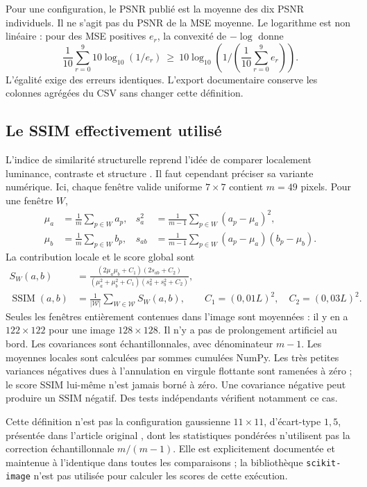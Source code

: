 Pour une configuration, le PSNR publié est la moyenne des dix PSNR
individuels. Il ne s'agit pas du PSNR de la MSE moyenne. Le logarithme est
non linéaire : pour des MSE positives $e_r$, la convexité de $-\log$
donne
\begin{equation}
 \frac1{10}\sum_{r=0}^{9}10\log_{10}(1/e_r)
 \ \geq\ 10\log_{10}\!\left(1/\left(\frac1{10}\sum_{r=0}^{9}e_r\right)\right).
 \label{eq:psnr-mean}
\end{equation}
L'égalité exige des erreurs identiques. L'export documentaire conserve
les colonnes agrégées du CSV sans changer cette définition.

\subsection{Le SSIM effectivement utilisé}

L'indice de similarité structurelle reprend l'idée de comparer localement
luminance, contraste et structure \cite{wang2004}. Il faut cependant
préciser sa variante numérique. Ici, chaque fenêtre valide uniforme
$7\times7$ contient $m=49$ pixels. Pour une fenêtre $W$,
\begin{align}
 \mu_a&=\frac1m\sum_{p\in W}a_p,
 &s_a^2&=\frac1{m-1}\sum_{p\in W}(a_p-\mu_a)^2,\\
 \mu_b&=\frac1m\sum_{p\in W}b_p,
 &s_{ab}&=\frac1{m-1}\sum_{p\in W}(a_p-\mu_a)(b_p-\mu_b).
\end{align}
La contribution locale et le score global sont
\begin{align}
 S_W(a,b)&=
 \frac{(2\mu_a\mu_b+C_1)(2s_{ab}+C_2)}
      {(\mu_a^2+\mu_b^2+C_1)(s_a^2+s_b^2+C_2)},
 \label{eq:ssim-local}\\
 \operatorname{SSIM}(a,b)&=\frac1{|\mathcal W|}\sum_{W\in\mathcal W}S_W(a,b),
 \qquad C_1=(0{,}01L)^2,\quad C_2=(0{,}03L)^2.
 \label{eq:ssim-global}
\end{align}
Seules les fenêtres entièrement contenues dans l'image sont moyennées :
il y en a $122\times122$ pour une image $128\times128$. Il n'y a pas de
prolongement artificiel au bord. Les covariances sont échantillonnales,
avec dénominateur $m-1$. Les moyennes locales sont calculées par sommes
cumulées NumPy. Les très petites variances négatives dues à l'annulation
en virgule flottante sont ramenées à zéro ; le score SSIM lui-même n'est
jamais borné à zéro. Une covariance négative peut produire un SSIM
négatif. Des tests indépendants vérifient notamment ce cas.

Cette définition n'est pas la configuration gaussienne $11\times11$,
d'écart-type $1{,}5$, présentée dans l'article original
\cite{wang2004}, dont les statistiques pondérées n'utilisent pas la
correction échantillonnale $m/(m-1)$. Elle est explicitement documentée et maintenue à
l'identique dans toutes les comparaisons ; la bibliothèque
\texttt{scikit-image} n'est pas utilisée pour calculer les scores de cette
exécution.

